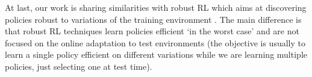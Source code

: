 \indent At last, our work is sharing similarities with robust RL which aims at discovering policies robust to variations of the training environment \citep{robustdeeprl,robustRL}. The main difference is that robust RL techniques learn policies efficient ‘in the worst case’ and are not focused on the online adaptation to test environments (the objective is usually to learn a single policy efficient on different variations while we are learning multiple policies, just selecting one at test time).


